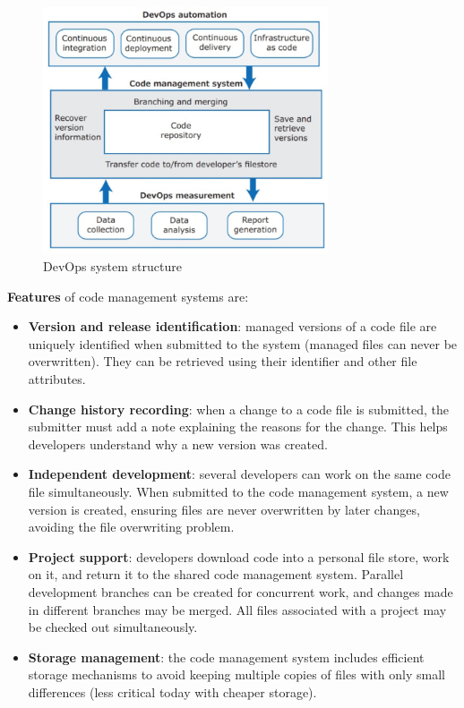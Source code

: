\begin{figure} [H]
    \centering
    \includegraphics[width=0.75\textwidth]{images/DevOps/code-management-system.png}
    \caption{DevOps system structure}
    \label{fig:code-management-system}
\end{figure} 

\noindent \textbf{Features} of code management systems are:
\begin{itemize}
    \item \textbf{Version and release identification}: managed versions of a code file are uniquely identified when submitted to the system (managed files can never be overwritten). They can be retrieved using their identifier and other file attributes.
    \item \textbf{Change history recording}: when a change to a code file is submitted, the submitter must add a note explaining the reasons for the change. This helps developers understand why a new version was created.
    \item \textbf{Independent development}: several developers can work on the same code file simultaneously. When submitted to the code management system, a new version is created, ensuring files are never overwritten by later changes, avoiding the file overwriting problem.
    \item \textbf{Project support}: developers download code into a personal file store, work on it, and return it to the shared code management system. Parallel development branches can be created for concurrent work, and changes made in different branches may be merged. All files associated with a project may be checked out simultaneously.
    \item \textbf{Storage management}: the code management system includes efficient storage mechanisms to avoid keeping multiple copies of files with only small differences (less critical today with cheaper storage).
\end{itemize}

